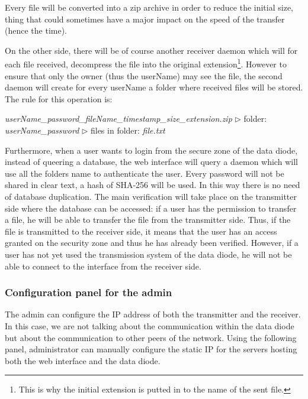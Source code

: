 \documentclass[a4paper,10pt]{article}
\begin{document}
Every file will be converted into a zip archive in order to reduce the initial size, thing that could sometimes have a major impact on the speed of the transfer (hence the time).\bigskip

On the other side, there will be of course another receiver daemon which will for each file received, decompress the file into the original extension\footnote{This is why the initial extension is putted in to the name of the sent file.}. However to ensure that only the owner (thus the userName) may see the file, the second daemon will create for every userName a folder where received files will be stored. The rule for this operation is:
\begin{center}
\centering
\emph{userName\_password\_fileName\_timestamp\_size\_extension.zip} $\triangleright$ folder: \emph{userName\_password} $\triangleright$ files in folder: \emph{file.txt}
\end{center}

Furthermore, when a user wants to login from the secure zone of the data diode, instead of queering a database, the web interface will query a daemon which will use all the folders name to authenticate the user. Every password will not be shared in clear text, a hash of SHA-256 will be used. In this way there is no need of database duplication. The main verification will take place on the transmitter side where the database can be accessed: if a user has the permission to transfer a file, he will be able to transfer the file from the transmitter side. Thus, if the file is transmitted to the receiver side, it means that the user has an access granted on the security zone and thus he has already been verified. However, if a user has not yet used the transmission system of the data diode, he will not be able to connect to the interface from the receiver side.

\subsubsection{Configuration panel for the admin}
The admin can configure the IP address of both the transmitter and the receiver. In this case, we are not talking about the communication within the data diode but about the communication to other peers of the network. Using the following panel, administrator can manually configure the static IP for the servers hosting both the web interface and the data diode.\bigskip
\end{document}
